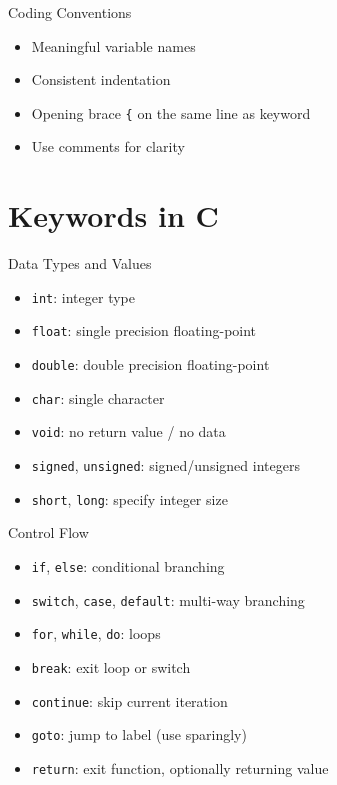 \documentclass[12pt, aspectratio=169]{beamer}
\begin{document}
    \begin{frame}{Coding Conventions}
        \begin{itemize}
            \item Meaningful variable names
            \item Consistent indentation
            \item Opening brace \texttt{\{} on the same line as keyword
            \item Use comments for clarity
        \end{itemize}
    \end{frame}


    \section{Keywords in C}

    \begin{frame}{Data Types and Values}
        \begin{itemize}
            \item \texttt{int}: integer type
            \item \texttt{float}: single precision floating-point
            \item \texttt{double}: double precision floating-point
            \item \texttt{char}: single character
            \item \texttt{void}: no return value / no data
            \item \texttt{signed}, \texttt{unsigned}: signed/unsigned integers
            \item \texttt{short}, \texttt{long}: specify integer size
        \end{itemize}
    \end{frame}


    \begin{frame}{Control Flow}
        \begin{itemize}
            \item \texttt{if}, \texttt{else}: conditional branching
            \item \texttt{switch}, \texttt{case}, \texttt{default}: multi-way branching
            \item \texttt{for}, \texttt{while}, \texttt{do}: loops
            \item \texttt{break}: exit loop or switch
            \item \texttt{continue}: skip current iteration
            \item \texttt{goto}: jump to label (use sparingly)
            \item \texttt{return}: exit function, optionally returning value
        \end{itemize}
    \end{frame}
\end{document}

